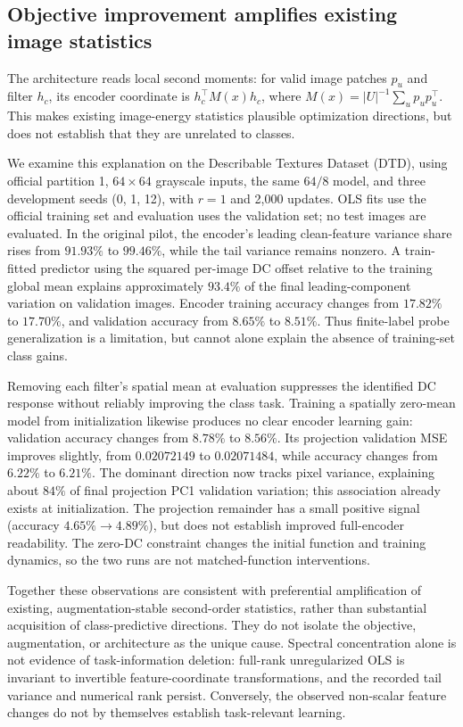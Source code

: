 \subsection{Objective improvement amplifies existing image statistics}
The architecture reads local second moments: for valid image patches $p_u$ and filter $h_c$, its encoder coordinate is $h_c^\top M(x)h_c$, where $M(x)=|U|^{-1}\sum_u p_up_u^\top$. This makes existing image-energy statistics plausible optimization directions, but does not establish that they are unrelated to classes.

We examine this explanation on the Describable Textures Dataset (DTD), using official partition 1, $64\times64$ grayscale inputs, the same $64/8$ model, and three development seeds (0, 1, 12), with $r=1$ and 2,000 updates. OLS fits use the official training set and evaluation uses the validation set; no test images are evaluated. In the original pilot, the encoder's leading clean-feature variance share rises from $91.93\%$ to $99.46\%$, while the tail variance remains nonzero. A train-fitted predictor using the squared per-image DC offset relative to the training global mean explains approximately $93.4\%$ of the final leading-component variation on validation images. Encoder training accuracy changes from $17.82\%$ to $17.70\%$, and validation accuracy from $8.65\%$ to $8.51\%$. Thus finite-label probe generalization is a limitation, but cannot alone explain the absence of training-set class gains.

Removing each filter's spatial mean at evaluation suppresses the identified DC response without reliably improving the class task. Training a spatially zero-mean model from initialization likewise produces no clear encoder learning gain: validation accuracy changes from $8.78\%$ to $8.56\%$. Its projection validation MSE improves slightly, from $0.02072149$ to $0.02071484$, while accuracy changes from $6.22\%$ to $6.21\%$. The dominant direction now tracks pixel variance, explaining about $84\%$ of final projection PC1 validation variation; this association already exists at initialization. The projection remainder has a small positive signal (accuracy $4.65\%\to4.89\%$), but does not establish improved full-encoder readability. The zero-DC constraint changes the initial function and training dynamics, so the two runs are not matched-function interventions.

Together these observations are consistent with preferential amplification of existing, augmentation-stable second-order statistics, rather than substantial acquisition of class-predictive directions. They do not isolate the objective, augmentation, or architecture as the unique cause. Spectral concentration alone is not evidence of task-information deletion: full-rank unregularized OLS is invariant to invertible feature-coordinate transformations, and the recorded tail variance and numerical rank persist. Conversely, the observed non-scalar feature changes do not by themselves establish task-relevant learning.


